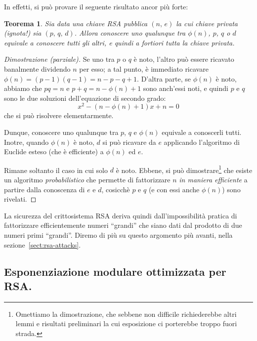 \documentclass[pdflatex,11pt,a4paper,oneside]{article}
\let\OldEmph\emph
\renewcommand{\emph}[1]{\OldEmph{#1\/}}
\newcommand{\p}[1]{\left({#1}\right)}
\newcommand{\ephi}[1]{\ensuremath{\phi\p{#1}}}
\newtheorem{theorem}[TheoremLike]{Teorema}
\begin{document}
\medskip\noindent
In effetti, si pu\`o provare il seguente risultato ancor pi\`u forte:
\begin{theorem}
Sia data una chiave RSA pubblica $(n,\, e)$ la cui chiave privata
(ignota!) sia $(p,\, q,\, d)$.  Allora conoscere uno qualunque tra
$\ephi{n}$, $p$, $q$ o $d$ equivale a conoscere tutti gli altri, e
quindi \emph{a fortiori} tutta la chiave privata.
\end{theorem}
%
\begin{proof}[Dimostrazione (parziale)]
Se uno tra $p$ o $q$ \`e noto, l'altro pu\`o essere ricavato banalmente
dividendo $n$ per esso; a tal punto, \`e immediato ricavare $\ephi{n} =
(p - 1) (q - 1) = n - p - q + 1$.  D'altra parte, se $\ephi{n}$ \`e
noto, abbiamo che $pq = n$ e $p + q = n - \ephi{n} + 1$ sono anch'essi
noti, e quindi $p$ e $q$ sono le due soluzioni dell'equazione di secondo
grado:
  $$ x^2 - \p{n - \ephi{n} + 1} x + n = 0 $$
che si pu\`o risolvere elementarmente.

Dunque, conoscere uno qualunque tra $p$, $q$ e $\ephi{n}$ equivale a
conoscerli tutti. Inotre, quando $\ephi{n}$ \`e noto, $d$ si pu\`o
ricavare da $e$ applicando l'algoritmo di Euclide esteso (che \`e
efficiente) a $\ephi{n}$ ed $e$.

Rimane soltanto il caso in cui solo $d$ \`e noto.  Ebbene, si pu\`o
dimostrare\footnote{Omettiamo la dimostrazione, che sebbene non difficile
richiederebbe altri lemmi e risultati preliminari la cui esposizione ci
porterebbe troppo fuori strada.} che esiste un algoritmo
\emph{probabilistico\/} che permette di fattorizzare $n$ \emph{in maniera
efficiente} a partire dalla conoscenza di $e$ e $d$, cosicch\`e  $p$ e $q$
(e con essi anche $\ephi{n}$) sono rivelati.
\end{proof}

La sicurezza del crittosistema RSA deriva quindi dall'impossibilit\`a
pratica di fattorizzare efficientemente numeri ``grandi'' che siano
dati dal prodotto di due numeri primi ``grandi''.  Diremo di pi\`u su
questo argomento pi\`u avanti, nella sezione~\eqref{sect:rsa-attacks}.

\subsection{Esponenziazione modulare ottimizzata per RSA.}
\end{document}
